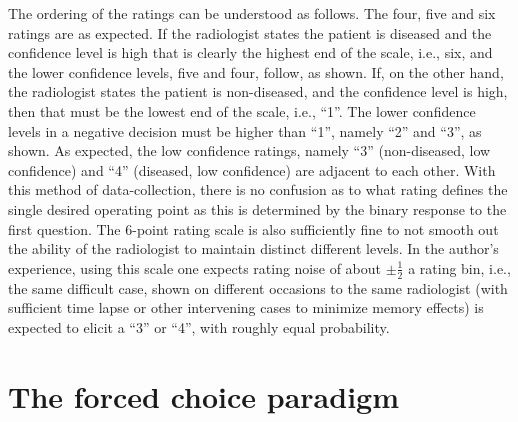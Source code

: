 \documentclass[
]{book}
\begin{document}
The ordering of the ratings can be understood as follows. The four, five and six ratings are as expected. If the radiologist states the patient is diseased and the confidence level is high that is clearly the highest end of the scale, i.e., six, and the lower confidence levels, five and four, follow, as shown. If, on the other hand, the radiologist states the patient is non-diseased, and the confidence level is high, then that must be the lowest end of the scale, i.e., ``1''. The lower confidence levels in a negative decision must be higher than ``1'', namely ``2'' and ``3'', as shown. As expected, the low confidence ratings, namely ``3'' (non-diseased, low confidence) and ``4'' (diseased, low confidence) are adjacent to each other. With this method of data-collection, there is no confusion as to what rating defines the single desired operating point as this is determined by the binary response to the first question. The 6-point rating scale is also sufficiently fine to not smooth out the ability of the radiologist to maintain distinct different levels. In the author's experience, using this scale one expects rating noise of about \(\pm\frac{1}{2}\) a rating bin, i.e., the same difficult case, shown on different occasions to the same radiologist (with sufficient time lapse or other intervening cases to minimize memory effects) is expected to elicit a ``3'' or ``4'', with roughly equal probability.

\hypertarget{the-forced-choice-paradigm}{%
\section{The forced choice paradigm}\label{the-forced-choice-paradigm}}
\end{document}
